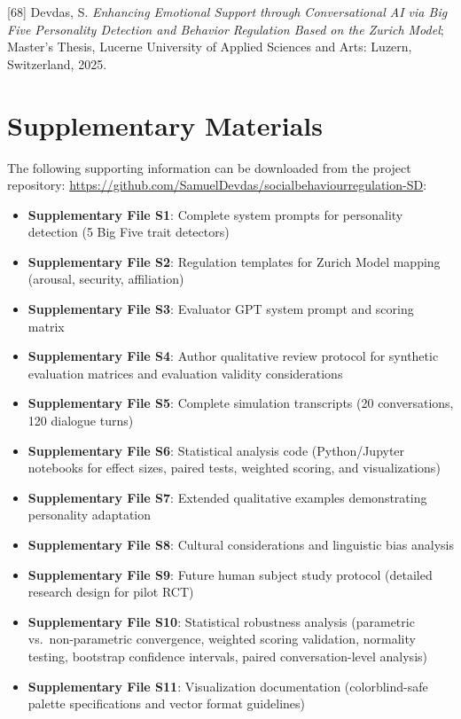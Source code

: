 \documentclass[apajournal,article,submit,moreauthors]{Definitions/mdpi}
\providecommand\tightlist{}
\begin{document}
{[}68{]} Devdas, S. \emph{Enhancing Emotional Support through Conversational AI via Big Five Personality Detection and Behavior Regulation Based on the Zurich Model}; Master's Thesis, Lucerne University of Applied Sciences and Arts: Luzern, Switzerland, 2025.

\section{Supplementary Materials}\label{supplementary-materials}

The following supporting information can be downloaded from the project repository: \url{https://github.com/SamuelDevdas/socialbehaviourregulation-SD}:

\begin{itemize}
\tightlist
\item
  \textbf{Supplementary File S1}: Complete system prompts for personality detection (5 Big Five trait detectors)
\item
  \textbf{Supplementary File S2}: Regulation templates for Zurich Model mapping (arousal, security, affiliation)
\item
  \textbf{Supplementary File S3}: Evaluator GPT system prompt and scoring matrix
\item
  \textbf{Supplementary File S4}: Author qualitative review protocol for synthetic evaluation matrices and evaluation validity considerations
\item
  \textbf{Supplementary File S5}: Complete simulation transcripts (20 conversations, 120 dialogue turns)
\item
  \textbf{Supplementary File S6}: Statistical analysis code (Python/Jupyter notebooks for effect sizes, paired tests, weighted scoring, and visualizations)
\item
  \textbf{Supplementary File S7}: Extended qualitative examples demonstrating personality adaptation
\item
  \textbf{Supplementary File S8}: Cultural considerations and linguistic bias analysis
\item
  \textbf{Supplementary File S9}: Future human subject study protocol (detailed research design for pilot RCT)
\item
  \textbf{Supplementary File S10}: Statistical robustness analysis (parametric vs.~non-parametric convergence, weighted scoring validation, normality testing, bootstrap confidence intervals, paired conversation-level analysis)
\item
  \textbf{Supplementary File S11}: Visualization documentation (colorblind-safe palette specifications and vector format guidelines)

\end{itemize}
\end{document}
